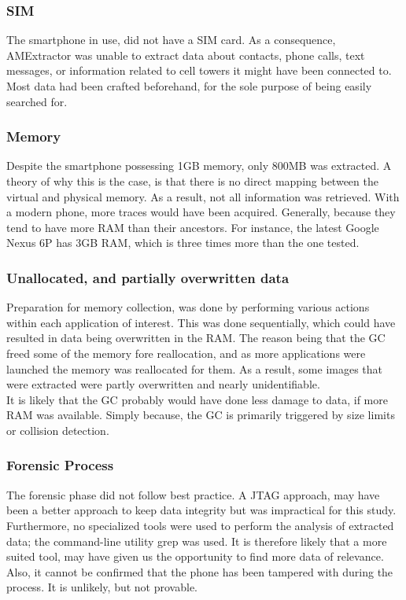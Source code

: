 \subsubsection{SIM}
The smartphone in use, did not have a SIM card. As a consequence, AMExtractor was unable to extract data about contacts, phone calls, text messages, or information related to cell towers it might have been connected to. Most data had been crafted beforehand, for the sole purpose of being easily searched for.
\subsubsection{Memory}
Despite the smartphone possessing 1GB memory, only 800MB was extracted. A theory of why this is the case, is that there is no direct mapping between the virtual and physical memory. As a result, not all information was retrieved. With a modern phone, more traces would have been acquired. Generally, because they tend to have more RAM than their ancestors. For instance, the latest Google Nexus 6P has 3GB RAM, which is three times more than the one tested\cite{huawei}.
\subsubsection{Unallocated, and partially overwritten data}
Preparation for memory collection, was done by performing various actions within each application of interest. This was done sequentially, which could have resulted in data being overwritten in the RAM. The reason being that the GC freed some of the memory fore reallocation, and as more applications were launched the memory was reallocated for them. As a result, some images that were extracted were partly overwritten and nearly unidentifiable.\\
It is likely that the GC probably would have done less damage to data, if more RAM was available. Simply because, the GC is primarily triggered by size limits or collision detection.
\subsubsection{Forensic Process}
The forensic phase did not follow best practice. A JTAG approach, may have been a better approach to keep data integrity but was impractical for this study. Furthermore, no specialized tools were used to perform the analysis of extracted data; the command-line utility grep was used. It is therefore likely that a more suited tool, may have given us the opportunity to find more data of relevance. Also, it cannot be confirmed that the phone has been tampered with during the process. It is unlikely, but not provable.\\
